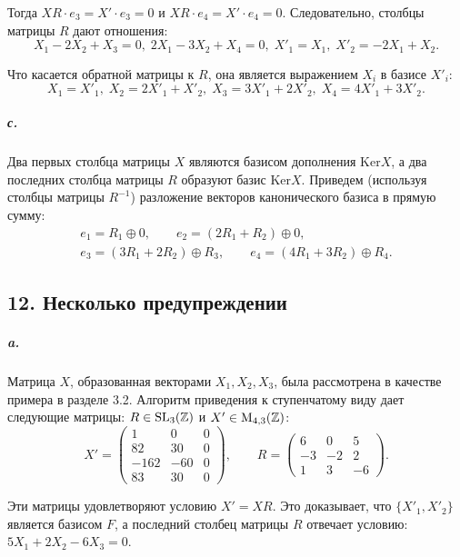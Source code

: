 {\noindent Тогда $XR \cdot e_3 = X' \cdot e_3 = 0$ и $XR \cdot e_4 = X' \cdot e_4 = 0$. Следовательно,
столбцы матрицы $R$ дают отношения:
\begin{equation*}
X_{1} - 2X_2 + X_3 = 0,\;2X_1 - 3X_2 + X_4 = 0,\;X'_{1} = X_1,\;X'_{2} = -2X_1 + X_2.
\end{equation*}

\noindent Что касается обратной матрицы к $R$, она является выражением $X_i$ в\linebreak
базисе $X'_{i}$:
\begin{equation*}
X_1 = X'_{1},\;X_2 = 2X'_{1} + X'_{2},\;X_3 = 3X'_{1} + 2X'_{2},\;X_4 = 4X'_{1} + 3X'_{2}.
\end{equation*}

\subparagraph{с.} Два первых столбца матрицы $X$ являются базисом дополнения
Ker{$X$}, а два последних столбца матрицы $R$ образуют базис Ker{$X$}. Приведем (используя столбцы матрицы $R^{-1}$) разложение векторов канонического базиса в прямую сумму:
\begin{gather*}
e_1 = R_1 \oplus 0,\qquad e_2 = (2R_1 + R_2) \oplus 0, \\
e_3 = (3R_1 + 2R_2) \oplus R_{3},\qquad e_4 = (4R_1 + 3R_2) \oplus R_4.
\end{gather*}

\subsection{\normalsize{12. Несколько предупреждении}}

\subparagraph{a.} Матрица $X$, образованная векторами $X_1, X_2, X_3$, была рассмотрена в качестве примера в разделе 3.2. Алгоритм приведения к ступенчатому виду дает следующие матрицы: $R \in \rm{SL_{3}}(\mathbb {Z})$ и $X' \in \rm{M_{4,3}}(\mathbb {Z})$:
\begin{equation*}
X' = {\begin{pmatrix} 1 & 0 & 0 \\ 82 & 30 & 0 \\ -162 & -60 & 0\\ 83 & 30 & 0 \end{pmatrix}}, \qquad
R = {\begin{pmatrix} 6 & 0 & 5 \\ -3 & -2 & 2 \\ 1 & 3 & -6 \end{pmatrix}}.
\end{equation*}

\noindent Эти матрицы удовлетворяют условию $X' = XR$. Это доказывает, что
$\{X'_{1},X'_{2}\}$ является базисом $F$, а последний столбец матрицы $R$ отвечает
условию: $5X_1 + 2X_2 - 6X_3 = 0$.

}
